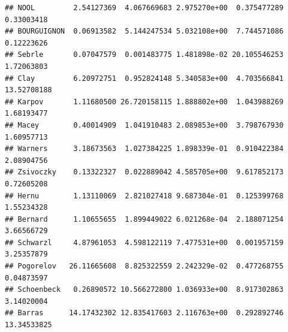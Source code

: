 \documentclass[
]{book}
\newenvironment{Shaded}{\begin{snugshade}}{\end{snugshade}}
\newcommand{\NormalTok}[1]{#1}
\newcommand{\SpecialCharTok}[1]{\textcolor[rgb]{0.81,0.36,0.00}{\textbf{#1}}}
\begin{document}
\begin{verbatim}
## NOOL         2.54127369  4.067669683 2.975270e+00  0.375477289  0.33003418
## BOURGUIGNON  0.06913582  5.144247534 5.032108e+00  7.744571086  0.12223626
## Sebrle       0.07047579  0.001483775 1.481898e-02 20.105546253  1.72063803
## Clay         6.20972751  0.952824148 5.340583e+00  4.703566841 13.52708188
## Karpov       1.11680500 26.720158115 1.888802e+00  1.043988269  1.68193477
## Macey        0.40014909  1.041910483 2.089853e+00  3.798767930  1.60957713
## Warners      3.18673563  1.027384225 1.898339e-01  0.910422384  2.08904756
## Zsivoczky    0.13322327  0.022889042 4.585705e+00  9.617852173  0.72605208
## Hernu        1.13110069  2.821027418 9.687304e-01  0.125399768  1.55234328
## Bernard      1.10655655  1.899449022 6.021268e-04  2.188071254  3.66566729
## Schwarzl     4.87961053  4.598122119 7.477531e+00  0.001957159  3.25357879
## Pogorelov   26.11665608  8.825322559 2.242329e-02  0.477268755  0.04873597
## Schoenbeck   0.26890572 10.566272800 1.036933e+00  8.917302863  3.14020004
## Barras      14.17432302 12.835417603 2.116763e+00  0.292892746 13.34533825
\end{verbatim}

\begin{Shaded}
\end{Shaded}
\end{document}
